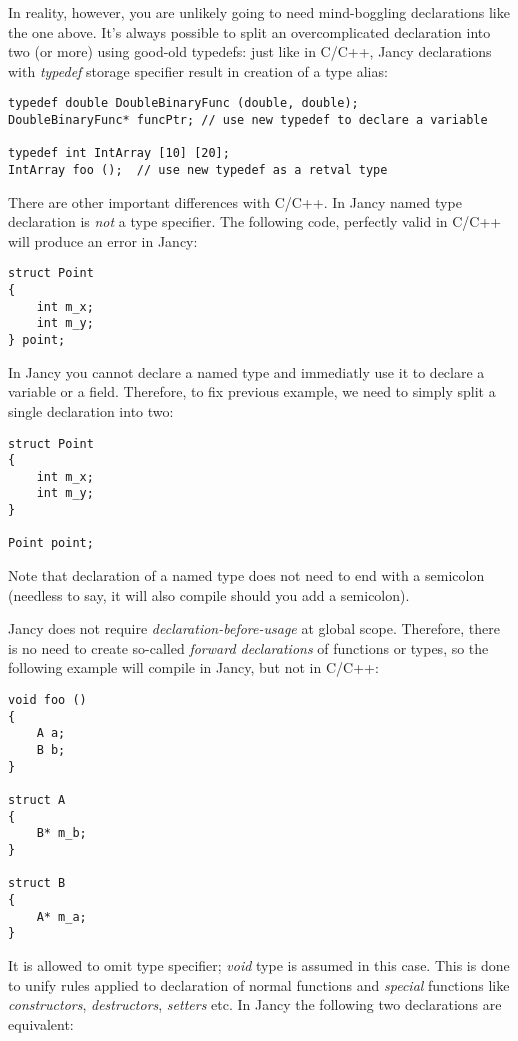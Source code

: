 \documentclass[oneside]{book}
\begin{document}
In reality, however, you are unlikely going to need mind-boggling declarations like the one above. It's always possible to split an overcomplicated declaration into two (or more) using good-old typedefs: just like in C/C++, Jancy declarations with \emph{typedef} storage specifier result in creation of a type alias:

\begin{lstlisting}
typedef double DoubleBinaryFunc (double, double);
DoubleBinaryFunc* funcPtr; // use new typedef to declare a variable

typedef int IntArray [10] [20];
IntArray foo ();  // use new typedef as a retval type
\end{lstlisting}

There are other important differences with C/C++. In Jancy named type declaration is \emph{not} a type specifier. The following code, perfectly valid in C/C++ will produce an error in Jancy:

\begin{lstlisting}
struct Point
{
	int m_x;
	int m_y;
} point;
\end{lstlisting}

In Jancy you cannot declare a named type and immediatly use it to declare a variable or a field. Therefore, to fix previous example, we need to simply split a single declaration into two:

\begin{lstlisting}
struct Point
{
	int m_x;
	int m_y;
} 

Point point;
\end{lstlisting}

Note that declaration of a named type does not need to end with a semicolon (needless to say, it will also compile should you add a semicolon).

Jancy does not require \emph{declaration-before-usage} at global scope. Therefore, there is no need to create so-called \emph{forward declarations} of functions or types, so the following example will compile in Jancy, but not in C/C++:

\begin{lstlisting}
void foo ()
{
	A a;
	B b;
}

struct A
{
	B* m_b;
}

struct B
{
	A* m_a;
}
\end{lstlisting}

It is allowed to omit type specifier; \emph{void} type is assumed in this case. This is done to unify rules applied to declaration of normal functions and \emph{special} functions like \emph{constructors}, \emph{destructors}, \emph{setters} etc. In Jancy the following two declarations are equivalent:
\end{document}
